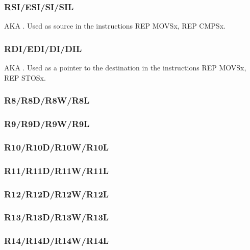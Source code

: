 \subsubsection{RSI/ESI/SI/SIL}

\ac{AKA} . Used as source in the instructions
REP MOVSx, REP CMPSx.

\subsubsection{RDI/EDI/DI/DIL}

\ac{AKA} .
Used as a pointer to the destination in the instructions
REP MOVSx, REP STOSx.

\subsubsection{R8/R8D/R8W/R8L}

\subsubsection{R9/R9D/R9W/R9L}

\subsubsection{R10/R10D/R10W/R10L}

\subsubsection{R11/R11D/R11W/R11L}

\subsubsection{R12/R12D/R12W/R12L}

\subsubsection{R13/R13D/R13W/R13L}

\subsubsection{R14/R14D/R14W/R14L}

